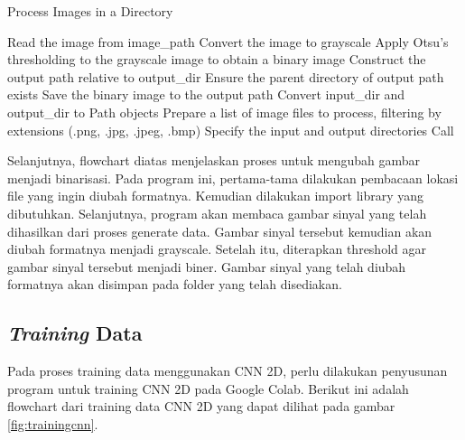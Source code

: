 \begin{algorithm}
  \caption{Process Images in a Directory}
  \begin{algorithmic}[1]
      \State Read the image from image\_path
      \State Convert the image to grayscale
      \State Apply Otsu's thresholding to the grayscale image to obtain a binary image
      \State Construct the output path relative to output\_dir
      \State Ensure the parent directory of output path exists
      \State Save the binary image to the output path
  \EndFunction
  \State
      \State Convert input\_dir and output\_dir to Path objects
      \State Prepare a list of image files to process, filtering by extensions (.png, .jpg, .jpeg, .bmp)
          \State {}
      \EndFor
  \EndProcedure
  \State
  \State Specify the input and output directories
  \State Call 
  \end{algorithmic}
\end{algorithm}  

Selanjutnya, flowchart diatas menjelaskan proses untuk mengubah gambar menjadi binarisasi. Pada program ini, pertama-tama dilakukan pembacaan lokasi file yang ingin diubah formatnya. Kemudian dilakukan import library yang dibutuhkan. Selanjutnya, program akan membaca gambar sinyal yang telah dihasilkan dari proses generate data. Gambar sinyal tersebut kemudian akan diubah formatnya menjadi grayscale. Setelah itu, diterapkan threshold agar gambar sinyal tersebut menjadi biner. Gambar sinyal yang telah diubah formatnya akan disimpan pada folder yang telah disediakan.

\subsection{\emph{Training} Data}
Pada proses training data menggunakan CNN 2D, perlu dilakukan penyusunan program untuk training CNN 2D pada Google Colab. Berikut ini adalah flowchart dari training data CNN 2D yang dapat dilihat pada gambar \ref{fig:trainingcnn}.

